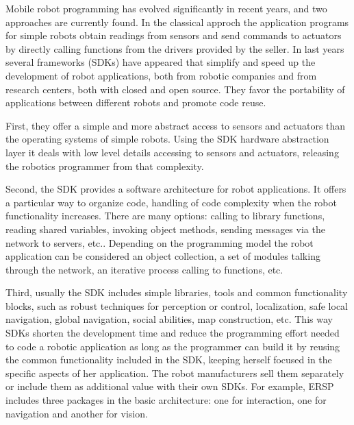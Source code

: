 \documentclass[twocolumn]{svjour3}          %
\begin{document}
Mobile robot programming has evolved significantly in recent years, and two approaches are currently found. In the classical approch the application programs for simple robots obtain readings from sensors and send commands to actuators by directly calling functions from the drivers provided by the seller. In last years several frameworks (SDKs) have appeared that simplify and speed up the development of robot applications, both from robotic companies and from research centers, both with closed and open source. They favor the portability of applications between different robots and promote code reuse.

First, they offer a simple and more abstract access to sensors and actuators than the operating systems of simple robots. Using the SDK hardware abstraction layer it deals with low level details accessing to sensors and actuators, releasing the robotics programmer from that complexity.

Second, the SDK provides a software architecture for robot applications. It offers a particular way to organize code, handling of code complexity when the robot functionality increases. There are many options: calling to library functions, reading shared variables, invoking object methods, sending messages via the network to servers, etc.. Depending on the programming model the robot application can be considered an object collection, a set of modules talking through the network, an iterative process calling to functions, etc.

Third, usually the SDK includes simple libraries, tools and common functionality blocks, such as robust techniques for perception or control, localization, safe local navigation, global navigation, social abilities, map construction, etc. This way SDKs shorten the development time and reduce the programming effort needed to code a robotic application as long as the programmer can build it by reusing the common functionality included in the SDK, keeping herself focused in the specific aspects of her application. The robot manufacturers sell them separately or include them as additional value with their own SDKs. For example, ERSP includes three packages in the basic architecture: one for interaction, one for navigation and another for vision. 
\end{document}
